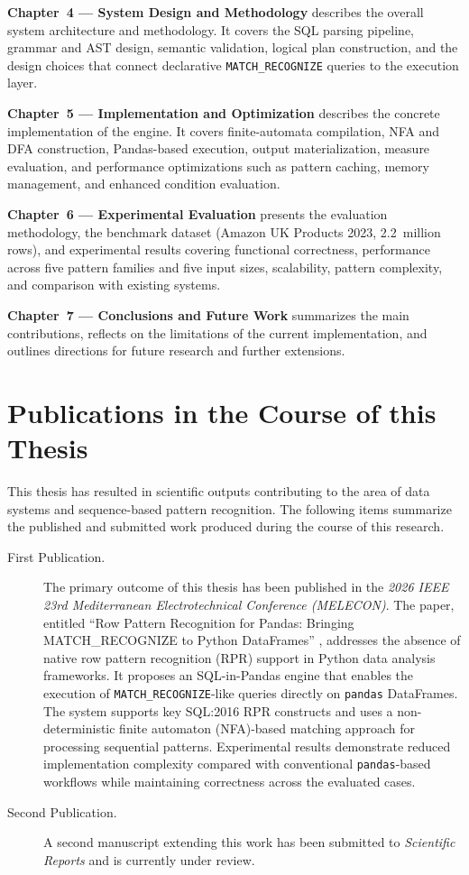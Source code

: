 \textbf{Chapter~4 --- System Design and Methodology}
describes the overall system architecture and methodology.  It
covers the SQL parsing pipeline, grammar and AST design, semantic
validation, logical plan construction, and the design choices that
connect declarative \texttt{MATCH\_RECOGNIZE} queries to the
execution layer.

\textbf{Chapter~5 --- Implementation and Optimization}
describes the concrete implementation of the engine.  It covers
finite-automata compilation, NFA and DFA construction, Pandas-based
execution, output materialization, measure evaluation, and
performance optimizations such as pattern caching, memory
management, and enhanced condition evaluation.

\textbf{Chapter~6 --- Experimental Evaluation}
presents the evaluation methodology, the benchmark dataset
(Amazon UK Products 2023, 2.2~million rows), and experimental
results covering functional correctness, performance across five
pattern families and five input sizes, scalability, pattern
complexity, and comparison with existing systems.

\textbf{Chapter~7 --- Conclusions and Future Work}
summarizes the main contributions, reflects on the limitations
of the current implementation, and outlines directions for
future research and further extensions.

\section{Publications in the Course of this Thesis}

This thesis has resulted in scientific outputs contributing to the
area of data systems and sequence-based pattern recognition.  The
following items summarize the published and submitted work produced
during the course of this research.

\begin{description}

\item[First Publication.]
The primary outcome of this thesis has been published in the
\textit{2026 IEEE 23rd Mediterranean Electrotechnical Conference
(MELECON)}.  The paper, entitled ``Row Pattern Recognition for
Pandas: Bringing MATCH\_\allowbreak RECOGNIZE to Python DataFrames''
\cite{lawande2026rpr}, addresses the absence of native row pattern
recognition (RPR) support in Python data analysis frameworks.  It
proposes an SQL-in-Pandas engine that enables the execution of
\texttt{MATCH\_RECOGNIZE}-like queries directly on \texttt{pandas}
DataFrames.  The system supports key SQL:2016 RPR constructs and
uses a non-deterministic finite automaton (NFA)-based matching
approach for processing sequential patterns.  Experimental results
demonstrate reduced implementation complexity compared with
conventional \texttt{pandas}-based workflows while maintaining
correctness across the evaluated cases.

\item[Second Publication.]
A second manuscript extending this work has been submitted to
\textit{Scientific Reports} and is currently under review.

\end{description}

